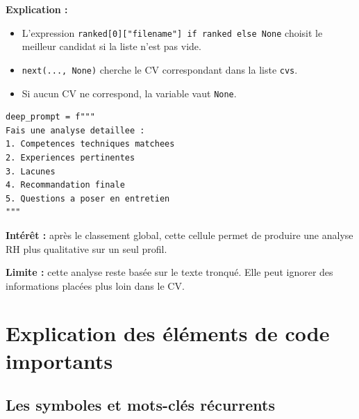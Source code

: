 \documentclass[12pt,a4paper]{article}
\begin{document}
\textbf{Explication :}
\begin{itemize}
  \item L'expression \texttt{ranked[0]["filename"] if ranked else None} choisit le meilleur candidat si la liste n'est pas vide.
  \item \texttt{next(..., None)} cherche le CV correspondant dans la liste \texttt{cvs}.
  \item Si aucun CV ne correspond, la variable vaut \texttt{None}.
\end{itemize}

\begin{lstlisting}[style=pythonstyle]
deep_prompt = f"""
Fais une analyse detaillee :
1. Competences techniques matchees
2. Experiences pertinentes
3. Lacunes
4. Recommandation finale
5. Questions a poser en entretien
"""
\end{lstlisting}

\textbf{Intérêt :} après le classement global, cette cellule permet de produire une analyse RH plus qualitative sur un seul profil.

\textbf{Limite :} cette analyse reste basée sur le texte tronqué. Elle peut ignorer des informations placées plus loin dans le CV.

\section{Explication des éléments de code importants}

\subsection{Les symboles et mots-clés récurrents}
\end{document}

